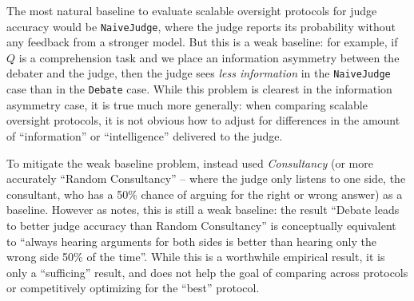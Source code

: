 \begin{example}
    The most natural baseline to evaluate scalable oversight protocols for judge accuracy would be \texttt{NaiveJudge}, where the judge reports its probability without any feedback from a stronger model. But this is a weak baseline: for example, if $Q$ is a comprehension task and we place an information asymmetry between the debater and the judge, then the judge sees \emph{less information} in the \texttt{NaiveJudge} case than in the \texttt{Debate} case. While this problem is clearest in the information asymmetry case, it is true much more generally: when comparing scalable oversight protocols, it is not obvious how to adjust for differences in the amount of ``information'' or ``intelligence'' delivered to the judge.
\end{example}

To mitigate the weak baseline problem, \previouswork{} instead used \emph{Consultancy} (or more accurately ``Random Consultancy'' -- where the judge only listens to one side, the consultant, who has a 50\% chance of arguing for the right or wrong answer) as a baseline. However as \citet{kentonScalableOversightWeak2024} notes, this is still a weak baseline: the result ``Debate leads to better judge accuracy than Random Consultancy'' is conceptually equivalent to ``always hearing arguments for both sides is better than hearing only the wrong side 50\% of the time''. While this is a worthwhile empirical result, it is only a ``sufficing'' result, and does not help the goal of comparing across protocols or competitively optimizing for the ``best'' protocol.



